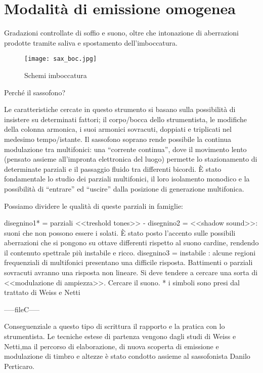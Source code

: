 \section{Modalità di emissione omogenea}

Gradazioni controllate di soffio e suono, oltre che intonazione di aberrazioni prodotte tramite saliva e spostamento dell'imboccatura.     

\begin{figure}
\centering
{\texttt{[image: sax\_boc.jpg]}}
\caption[Pianta S. Luca]{Schemi imboccatura}
\label{fig:tetratetra}
\end{figure}

Perché il sassofono?

Le caratteristiche cercate in questo strumento si basano sulla possibilità
di insistere su determinati fattori; il corpo/bocca dello strumentista, 
le modifiche della colonna armonica, i suoi armonici sovracuti, doppiati
e triplicati nel medesimo tempo/istante.
Il sassofono soprano rende possibile la continua modulazione tra multifonici:
una “corrente continua”,  dove il movimento lento (pensato assieme all'impronta
elettronica del luogo) permette lo stazionamento di determinate parziali
e il passaggio fluido tra differenti bicordi. È stato fondamentale lo studio
dei parziali multifonici, il loro isolamento monodico e la possibilità di 
“entrare” ed “uscire” dalla posizione di generazione multifonica.

Possiamo dividere le qualità di queste parziali in famiglie:

disegnino1* = parziali <<treshold tones>>  -  
disegnino2 = <<shadow sound>>: suoni che non possono essere i solati.
È stato posto l’accento sulle possibili aberrazioni che si pongono su ottave differenti
rispetto al suono cardine, rendendo il contenuto spettrale più instabile e ricco.
disegnino3 = instabile : alcune regioni frequenziali di multifonici presentano una
difficile risposta. Battimenti o parziali sovracuti avranno una risposta non lineare.
Si deve tendere a cercare una sorta di <<modulazione di ampiezza>>. Cercare il suono.
* i simboli sono presi dal trattato di Weiss e Netti



-----fileC-----



Conseguenziale a questo tipo di scrittura il  rapporto e la pratica con lo strumentista.
Le tecniche estese di partenza vengono dagli studi di Weiss e Netti,ma il percorso di
elaborazione, di nuova scoperta di emissione e modulazione di timbro e altezze è
stato condotto assieme al sassofonista Danilo Perticaro.

